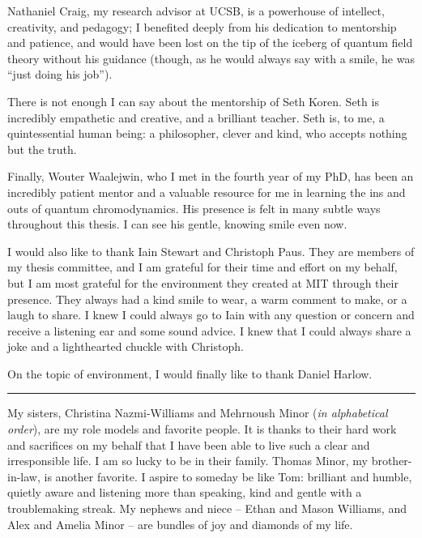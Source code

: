 Nathaniel Craig, my research advisor at UCSB, is a powerhouse of intellect, creativity, and pedagogy;
%
I benefited deeply from his dedication to mentorship and patience, and would have been lost on the tip of the iceberg of quantum field theory without his guidance (though, as he would always say with a smile, he was ``just doing his job'').



There is not enough I can say about the mentorship of Seth Koren.
%
Seth is incredibly empathetic and creative, and a brilliant teacher.
%
Seth is, to me, a quintessential human being:
%
a philosopher, clever and kind, who accepts nothing but the truth.



Finally, Wouter Waalejwin, who I met in the fourth year of my PhD, has been an incredibly patient mentor and a valuable resource for me in learning the ins and outs of quantum chromodynamics.
%
His presence is felt in many subtle ways throughout this thesis.
%
I can see his gentle, knowing smile even now.



I would also like to thank Iain Stewart and Christoph Paus.
%
They are members of my thesis committee, and I am grateful for their time and effort on my behalf, but I am most grateful for the environment they created at MIT through their presence.
%
They always had a kind smile to wear, a warm comment to make, or a laugh to share.
%
I knew I could always go to Iain with any question or concern and receive a listening ear and some sound advice.
%
I knew that I could always share a joke and a lighthearted chuckle with Christoph.



On the topic of environment, I would finally like to thank Daniel Harlow.
%
\sam{}


\vspace{12pt}
\hrule
\vspace{12pt}


My sisters, Christina Nazmi-Williams and Mehrnoush Minor (\textit{in alphabetical order}), are my role models and favorite people.
%
It is thanks to their hard work and sacrifices on my behalf that I have been able to live such a clear and irresponsible life.
%
I am so lucky to be in their family.
%
Thomas Minor, my brother-in-law, is another favorite.
%
I aspire to someday be like Tom:
%
brilliant and humble, quietly aware and listening more than speaking, kind and gentle with a troublemaking streak.
%
My nephews and niece -- Ethan and Mason Williams, and Alex and Amelia Minor -- are bundles of joy and diamonds of my life.



